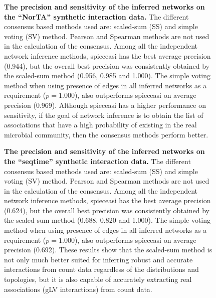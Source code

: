  \begin{figure}[H]
    \centering
      \caption{
        \textbf{The precision and sensitivity of the inferred networks on the ``NorTA'' synthetic interaction data.}
        The different consensus based methods used are: scaled-sum (SS) and simple voting (SV) method.
        Pearson and Spearman methods are not used in the calculation of the consensus.
        Among all the independent network inference methods, \ac{spieceasi} has the best average precision (0.944), but the overall best precision was consistently obtained by the scaled-sum method (0.956, 0.985 and 1.000).
        The simple voting method when using presence of edges in all inferred networks as a requirement ($p = 1.000$), also outperforms \ac{spieceasi} on average precision (0.969).
        Although \ac{spieceasi} has a higher performance on sensitivity, if the goal of network inference is to obtain the list of associations that have a high probability of existing in the real microbial community, then the consensus methods perform better.
      }
    \label{fig:figure_s5}
  \end{figure}

  \begin{figure}[H]
    \centering
      \caption{
        \textbf{The precision and sensitivity of the inferred networks on the ``seqtime'' synthetic interaction data.}
        The different consensus based methods used are: scaled-sum (SS) and simple voting (SV) method.
        Pearson and Spearman methods are not used in the calculation of the consensus.
        Among all the independent network inference methods, \ac{spieceasi} has the best average precision (0.624), but the overall best precision was consistently obtained by the scaled-sum method (0.688, 0.820 and 1.000).
        The simple voting method when using presence of edges in all inferred networks as a requirement ($p = 1.000$), also outperforms \ac{spieceasi} on average precision (0.692).
        These results show that the scaled-sum method is not only much better suited for inferring robust and accurate interactions from count data regardless of the distributions and topologies, but it is also capable of accurately extracting real associations (gLV interactions) from count data.
      }
    \label{fig:figure_s6}
  \end{figure}

